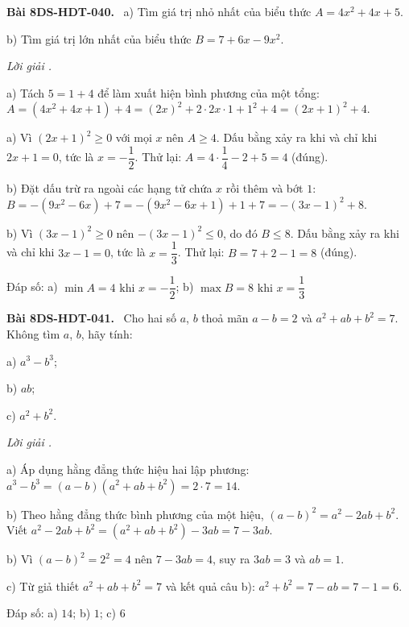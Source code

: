 \documentclass[12pt,a4paper]{article}
\newenvironment{problem}[1][]{\par\medskip\noindent\textbf{Bài #1.}\ }{\par}
\newenvironment{solution}[1][]{\par\noindent\textit{Lời giải #1.}\par}{\par}
\begin{document}
\begin{problem}[8DS-HDT-040]
a) Tìm giá trị nhỏ nhất của biểu thức $A = 4x^2 + 4x + 5$.

b) Tìm giá trị lớn nhất của biểu thức $B = 7 + 6x - 9x^2$.

\begin{solution}
a) Tách $5 = 1 + 4$ để làm xuất hiện bình phương của một tổng: $A = (4x^2 + 4x + 1) + 4 = (2x)^2 + 2 \cdot 2x \cdot 1 + 1^2 + 4 = (2x + 1)^2 + 4$.

a) Vì $(2x + 1)^2 \geq 0$ với mọi $x$ nên $A \geq 4$. Dấu bằng xảy ra khi và chỉ khi $2x + 1 = 0$, tức là $x = -\dfrac{1}{2}$. Thử lại: $A = 4 \cdot \dfrac{1}{4} - 2 + 5 = 4$ (đúng).

b) Đặt dấu trừ ra ngoài các hạng tử chứa $x$ rồi thêm và bớt $1$: $B = -(9x^2 - 6x) + 7 = -(9x^2 - 6x + 1) + 1 + 7 = -(3x - 1)^2 + 8$.

b) Vì $(3x - 1)^2 \geq 0$ nên $-(3x - 1)^2 \leq 0$, do đó $B \leq 8$. Dấu bằng xảy ra khi và chỉ khi $3x - 1 = 0$, tức là $x = \dfrac{1}{3}$. Thử lại: $B = 7 + 2 - 1 = 8$ (đúng).

Đáp số: a) $\boxed{\min A = 4 \text{ khi } x = -\dfrac{1}{2}}$; b) $\boxed{\max B = 8 \text{ khi } x = \dfrac{1}{3}}$
\end{solution}
\end{problem}

\begin{problem}[8DS-HDT-041]
Cho hai số $a$, $b$ thoả mãn $a - b = 2$ và $a^2 + ab + b^2 = 7$. Không tìm $a$, $b$, hãy tính:

a) $a^3 - b^3$;

b) $ab$;

c) $a^2 + b^2$.

\begin{solution}
a) Áp dụng hằng đẳng thức hiệu hai lập phương: $a^3 - b^3 = (a - b)(a^2 + ab + b^2) = 2 \cdot 7 = 14$.

b) Theo hằng đẳng thức bình phương của một hiệu, $(a - b)^2 = a^2 - 2ab + b^2$. Viết $a^2 - 2ab + b^2 = (a^2 + ab + b^2) - 3ab = 7 - 3ab$.

b) Vì $(a - b)^2 = 2^2 = 4$ nên $7 - 3ab = 4$, suy ra $3ab = 3$ và $ab = 1$.

c) Từ giả thiết $a^2 + ab + b^2 = 7$ và kết quả câu b): $a^2 + b^2 = 7 - ab = 7 - 1 = 6$.

Đáp số: a) $\boxed{14}$; b) $\boxed{1}$; c) $\boxed{6}$
\end{solution}
\end{problem}
\end{document}
